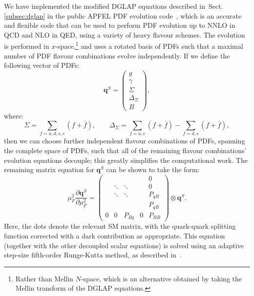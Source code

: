 \documentclass[withindex,glossary]{cam-thesis}
\renewcommand{\vec}[1]{\textbf{#1}} %
\begin{document}
We have implemented the modified DGLAP equations described in~Sect. \ref{subsec:dglap} in the
public APFEL PDF evolution code~\cite{Bertone:2013vaa}, which is an accurate and flexible code that can be used to perform PDF evolution up to NNLO
in QCD and NLO in QED, using a variety of heavy flavour schemes.
The evolution is performed in $x$-space,\footnote{Rather than Mellin $N$-space, which is an alternative obtained by taking the Mellin transform of the DGLAP equations.} and uses a rotated 
basis of PDFs such that a maximal number of PDF flavour combinations
evolve independently. If we define the following vector of PDFs:
\begin{equation}
\label{eq:singlet}
\vec{q}^S = \begin{pmatrix} g \\ \gamma \\ \Sigma \\ \Delta_{\Sigma} \\ B\end{pmatrix},
\end{equation}
where:
\begin{equation}
\label{eq:singlet2}
\Sigma = \sum_{f=u,d,s,c} (f + \bar{f}), \qquad \Delta_{\Sigma} = \sum_{f=u,c} (f + \bar{f}) - \sum_{f=d,s} (f + \bar{f}),
\end{equation}
then we can choose further independent flavour combinations of PDFs, spanning the
complete space of PDFs, such that all of the remaining flavour combinations' evolution equations decouple;
 this greatly simplifies the computational work. The remaining matrix equation for $\vec{q}^S$ can 
 be shown to take the form:
 \renewcommand{\arraystretch}{0.8}
\begin{equation}
\label{eq:dglapevolution}
\mu_F^2 \frac{\partial \vec{q}^S}{\partial \mu_F^2} = \left(\begin{array}{cccc|c} & & & &  0 \\ & \ddots& \ddots& & 0 \\ & \ddots& \ddots& & P_{q B} \\[1ex] & & & & P_{q B} \\[1ex] \hline 0 & 0 & P_{Bq} & 0 & P_{BB} \end{array}\right) \otimes \vec{q}^S.
\end{equation}
Here, the dots denote the relevant SM matrix, with the quark-quark splitting function corrected with a dark contribution as appropriate. This equation (together with the other decoupled scalar equations) is solved using an adaptive step-size fifth-order Runge-Kutta method, 
as described in~\cite{Bertone:2013vaa}.%
\end{document}
